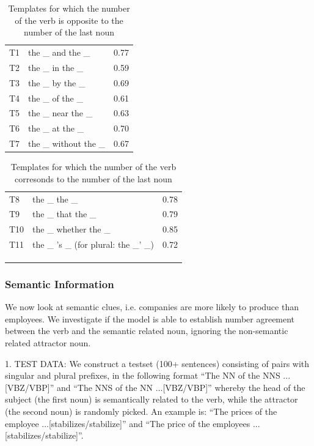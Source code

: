 \begin{table}[t] 
\parbox{\linewidth}{
\centering
\begin{tabular}{ l l r }
  T1    & the \_ and the \_     &  0.77 \\
  T2    & the \_ in the \_      &  0.59 \\
  T3    & the \_ by the \_      &  0.69 \\
  T4    & the \_ of the \_      &  0.61 \\
  T5    & the \_ near the \_    &  0.63\\
  T6    & the \_ at the \_      &  0.70\\
  T7    & the \_ without the \_ & 0.67  \\
\end{tabular}
\caption{Templates for which the number of the verb 
is opposite to the number of the last noun} 
\label{tab:attractor_templates}
}
\end{table}


\begin{table}[t] 
\parbox{\linewidth}{
\centering
\begin{tabular}{ l l r }
  T8    & the \_ the \_         &  0.78\\
  T9    & the \_ that the \_    &  0.79\\
  T10   & the \_ whether the \_ &  0.85\\
  T11   & the \_ 's \_ (for plural: the \_' \_)          &  0.72 \\
\\
\\
\\
\end{tabular}
\caption{Templates for which the number of the verb 
corresonds to the number of the last noun} 
\label{tab:lastnoun_templates}
}
\end{table}


\subsubsection{Semantic Information}

We now look at semantic clues, i.e. companies
are more likely to produce than employees.
We investigate if the model is able to establish
number agreement between the verb and the semantic related noun,
ignoring the non-semantic related attractor noun.
  
1. TEST DATA:
We construct a testset (100+ sentences) consisting of pairs with singular and plural prefixes, in the following format  
``The NN of the NNS ...[VBZ/VBP]'' and
``The NNS of the NN ...[VBZ/VBP]'' 
whereby the head of the subject (the first noun)
is semantically related to the verb, while the attractor (the second noun)
is randomly picked. An example is:
``The prices of the employee ...[stabilizes/stabilize]'' and 
``The price of the employees ...[stabilizes/stabilize]''.

